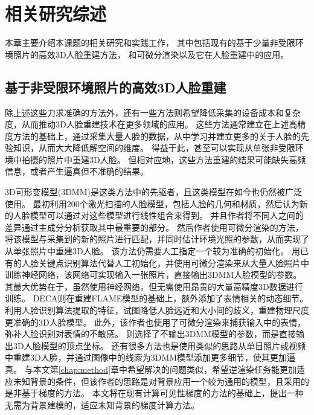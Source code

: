 \chapter{相关研究综述}
\label{chap:related_work}

本章主要介绍本课题的相关研究和实践工作，
其中包括现有的基于少量非受限环境照片的高效3D人脸重建方法，
和可微分渲染以及它在人脸重建中的应用。

\section{基于非受限环境照片的高效3D人脸重建}

除上述这些力求准确的方法外，还有一些方法则希望降低采集的设备成本和复杂度，从而推动3D人脸重建技术在更多领域的应用。
这些方法通常建立在上述高精度方法的基础上，通过采集大量人脸的数据，从中学习并建立更多的关于人脸的先验知识，从而大大降低解空间的维度。
得益于此，甚至可以实现从单张非受限环境中拍摄的照片中重建3D人脸。
但相对应地，这些方法重建的结果可能缺失高频信息，或者产生逼真但不准确的结果。

3D可形变模型(3DMM)是这类方法中的先驱者，且这类模型在如今也仍然被广泛使用。
最初\citet{3DMM}利用200个激光扫描的人脸模型，包括人脸的几何和材质，然后认为新的人脸模型可以通过对这些模型进行线性组合来得到。
并且作者将不同人之间的差异通过主成分分析获取其中最重要的部分。
然后作者使用可微分渲染的方法，将该模型与采集到的新的照片进行匹配，并同时估计环境光照的参数，从而实现了从单张照片中重建3D人脸。
该方法仍需要人工指定一个较为准确的初始化。
\citet{deep3d}用已有的人脸关键点识别算法代替人工初始化，并使用可微分渲染来从大量人脸照片中训练神经网络，该网络可实现输入一张照片，直接输出3DMM人脸模型的参数。其最大优势在于，虽然使用神经网络，但无需使用昂贵的大量高精度3D数据进行训练。
DECA\citep{DECA}则在重建FLAME模型的基础上，额外添加了表情相关的动态细节。
\citet{ZielonkaBT22}利用人脸识别算法提取的特征，试图降低人脸远近和大小间的歧义，重建物理尺度更准确的3D人脸模型。
此外，该作者也使用了可微分渲染来捕获输入中的表情，弥补人脸识别对表情的不敏感。
\citet{1022667848.nh,feng2018prn}则选择了不输出3DMM模型的参数，而是直接输出3D人脸模型的顶点坐标。
还有很多方法\citep{GarridoVWT13,CaoBZB15,ShiWTC14,IchimBP15}也是使用类似的思路从单目照片或视频中重建3D人脸，并通过图像中的线索为3DMM模型添加更多细节，使其更加逼真。
\citet{SchonbornEFV15}与本文第\ref{chap:method}章中希望解决的问题类似，希望逆渲染任务能更加适应未知背景的条件，但该作者的思路是对背景应用一个较为通用的模型，且采用的是非基于梯度的方法。
本文将在现有计算可见性梯度的方法的基础上，提出一种无需为背景建模的，适应未知背景的梯度计算方法。

